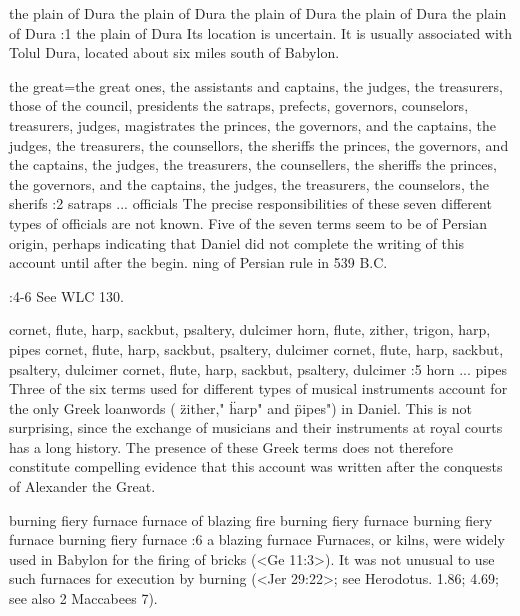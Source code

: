     {the plain of Dura} %
    {the plain of Dura} %
    {the plain of Dura} %
    {the plain of Dura} %
    {the plain of Dura} %
:1 {the plain of Dura} Its location is uncertain. It is usually associated with 
Tolul Dura, located about six miles south of Babylon.


    {the great}={the great ones, the assistants and captains, the judges, the treasurers, those of the council, presidents} %
    {the satraps, prefects, governors, counselors, treasurers, judges, magistrates} %
    {the princes, the governors, and the captains, the judges, the treasurers, the counsellors, the sheriffs} %
    {the princes, the governors, and the captains, the judges, the treasurers, the counsellers, the sheriffs} %
    {the princes, the governors, and the captains, the judges, the treasurers, the counselors, the sherifs} %
:2 {satraps ... officials} The precise responsibilities of these seven different types of officials
are not known. Five of the seven  terms seem to be of Persian origin, perhaps indicating that Daniel 
did not complete the writing of this account until after the begin. 
ning of Persian rule in 539 B.C.

:4-6 {}  See WLC 130.

    {cornet, flute, harp, sackbut, psaltery, dulcimer} %
    {horn, flute, zither, trigon, harp, pipes} %
    {cornet, flute, harp, sackbut, psaltery, dulcimer} %
    {cornet, flute, harp, sackbut, psaltery, dulcimer} %
    {cornet, flute, harp, sackbut, psaltery, dulcimer} %
:5 {horn ... pipes} Three of the six terms used for different types 
of musical instruments account for the only Greek loanwords 
( \"zither," \"harp" and \"pipes") in Daniel. This is not surprising, since 
the exchange of musicians and their instruments at royal courts 
has a long history. The presence of these Greek terms does not 
therefore constitute compelling evidence that this account was 
written after the conquests of Alexander the Great.

    {burning fiery furnace} %
    {furnace of blazing fire} %
    {burning fiery furnace} %
    {burning fiery furnace} %
    {burning fiery furnace} %
:6 {a blazing furnace} Furnaces, or kilns, were widely used in 
Babylon for the firing of bricks (<Ge 11:3>). It was not unusual to use 
such furnaces for execution by burning (<Jer 29:22>; see Herodotus. 
1.86; 4.69; see also 2 Maccabees 7).


